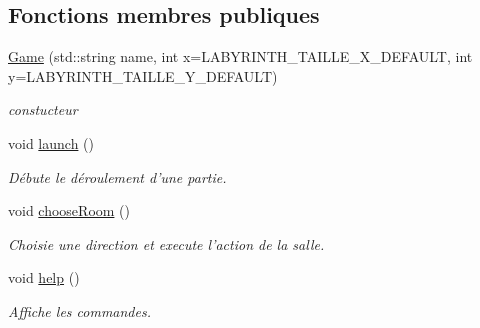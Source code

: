 \subsection*{Fonctions membres publiques}
\begin{DoxyCompactItemize}
\item 
\hyperlink{class_game_af7c8b29a2938f3881bfd598e4e156d3d}{Game} (std\-::string name, int x=L\-A\-B\-Y\-R\-I\-N\-T\-H\-\_\-\-T\-A\-I\-L\-L\-E\-\_\-\-X\-\_\-\-D\-E\-F\-A\-U\-L\-T, int y=L\-A\-B\-Y\-R\-I\-N\-T\-H\-\_\-\-T\-A\-I\-L\-L\-E\-\_\-\-Y\-\_\-\-D\-E\-F\-A\-U\-L\-T)
\begin{DoxyCompactList}\small\item\em constucteur \end{DoxyCompactList}\item 
\hypertarget{class_game_a35c46e76cde7773850820233754e0bc0}{void \hyperlink{class_game_a35c46e76cde7773850820233754e0bc0}{launch} ()}\label{class_game_a35c46e76cde7773850820233754e0bc0}

\begin{DoxyCompactList}\small\item\em Débute le déroulement d'une partie. \end{DoxyCompactList}\item 
\hypertarget{class_game_a70b3d987f25dd5e1aeb6ab18cfedc387}{void \hyperlink{class_game_a70b3d987f25dd5e1aeb6ab18cfedc387}{choose\-Room} ()}\label{class_game_a70b3d987f25dd5e1aeb6ab18cfedc387}

\begin{DoxyCompactList}\small\item\em Choisie une direction et execute l'action de la salle. \end{DoxyCompactList}\item 
\hypertarget{class_game_ae650b8abcc603580654b9aa375dc260a}{void \hyperlink{class_game_ae650b8abcc603580654b9aa375dc260a}{help} ()}\label{class_game_ae650b8abcc603580654b9aa375dc260a}

\begin{DoxyCompactList}\small\item\em Affiche les commandes. \end{DoxyCompactList}\end{DoxyCompactItemize}
